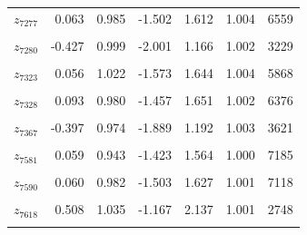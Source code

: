 \begin{longtable}{lrrrrrr}
$z_{7277}$ & 0.063 & 0.985 & -1.502 & 1.612 & 1.004 & 6559\\
\cellcolor{gray!10}{$z_{7279}$} & \cellcolor{gray!10}{0.206} & \cellcolor{gray!10}{0.962} & \cellcolor{gray!10}{-1.311} & \cellcolor{gray!10}{1.732} & \cellcolor{gray!10}{1.002} & \cellcolor{gray!10}{6322}\\
$z_{7280}$ & -0.427 & 0.999 & -2.001 & 1.166 & 1.002 & 3229\\
\cellcolor{gray!10}{$z_{7316}$} & \cellcolor{gray!10}{-0.557} & \cellcolor{gray!10}{1.031} & \cellcolor{gray!10}{-2.225} & \cellcolor{gray!10}{1.040} & \cellcolor{gray!10}{1.004} & \cellcolor{gray!10}{2195}\\
$z_{7323}$ & 0.056 & 1.022 & -1.573 & 1.644 & 1.004 & 5868\\
\cellcolor{gray!10}{$z_{7324}$} & \cellcolor{gray!10}{0.035} & \cellcolor{gray!10}{0.966} & \cellcolor{gray!10}{-1.508} & \cellcolor{gray!10}{1.584} & \cellcolor{gray!10}{1.002} & \cellcolor{gray!10}{6077}\\
$z_{7328}$ & 0.093 & 0.980 & -1.457 & 1.651 & 1.002 & 6376\\
\cellcolor{gray!10}{$z_{7363}$} & \cellcolor{gray!10}{0.087} & \cellcolor{gray!10}{0.943} & \cellcolor{gray!10}{-1.433} & \cellcolor{gray!10}{1.603} & \cellcolor{gray!10}{1.002} & \cellcolor{gray!10}{6331}\\
$z_{7367}$ & -0.397 & 0.974 & -1.889 & 1.192 & 1.003 & 3621\\
\cellcolor{gray!10}{$z_{7385}$} & \cellcolor{gray!10}{0.196} & \cellcolor{gray!10}{0.960} & \cellcolor{gray!10}{-1.338} & \cellcolor{gray!10}{1.734} & \cellcolor{gray!10}{1.004} & \cellcolor{gray!10}{5986}\\
$z_{7581}$ & 0.059 & 0.943 & -1.423 & 1.564 & 1.000 & 7185\\
\cellcolor{gray!10}{$z_{7582}$} & \cellcolor{gray!10}{0.094} & \cellcolor{gray!10}{0.998} & \cellcolor{gray!10}{-1.501} & \cellcolor{gray!10}{1.704} & \cellcolor{gray!10}{1.004} & \cellcolor{gray!10}{6482}\\
$z_{7590}$ & 0.060 & 0.982 & -1.503 & 1.627 & 1.001 & 7118\\
\cellcolor{gray!10}{$z_{7612}$} & \cellcolor{gray!10}{0.084} & \cellcolor{gray!10}{0.961} & \cellcolor{gray!10}{-1.413} & \cellcolor{gray!10}{1.595} & \cellcolor{gray!10}{1.001} & \cellcolor{gray!10}{6555}\\
$z_{7618}$ & 0.508 & 1.035 & -1.167 & 2.137 & 1.001 & 2748\\
\cellcolor{gray!10}{$z_{7621}$} & \cellcolor{gray!10}{0.115} & \cellcolor{gray!10}{0.996} & \cellcolor{gray!10}{-1.482} & \cellcolor{gray!10}{1.716} & \cellcolor{gray!10}{1.004} & \cellcolor{gray!10}{5957}\\

\end{longtable}
